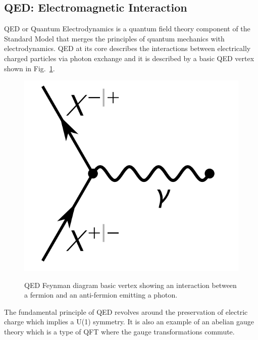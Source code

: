 \subsection{QED: Electromagnetic Interaction}
QED or Quantum Electrodynamics is a quantum field theory component of the Standard Model that merges the principles of quantum mechanics with electrodynamics. QED at its core describes the interactions between electrically charged particles via photon exchange and it is described by a basic QED vertex shown in Fig.~\ref{fig:QEDVertex}. 

\begin{figure}[!htbp]
	\centering
    \caption{QED Feynman diagram basic vertex showing an interaction between a fermion and an anti-fermion emitting a photon.}
    \includegraphics[scale=0.6]{fig/QEDfudnamental.png}
    \label{fig:QEDVertex}
\end{figure}

The fundamental principle of QED revolves around the preservation of electric charge which implies a U(1) symmetry. It is also an example of an abelian gauge theory which is a type of QFT where the gauge transformations commute. 


